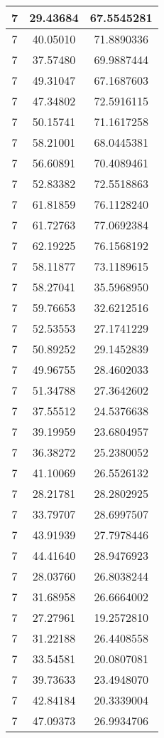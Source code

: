 \documentclass[
]{book}
\begin{document}
\begin{tabular}{c|c|c}
\hline
7 & 29.43684 & 67.5545281\\
\hline
7 & 40.05010 & 71.8890336\\
\hline
7 & 37.57480 & 69.9887444\\
\hline
7 & 49.31047 & 67.1687603\\
\hline
7 & 47.34802 & 72.5916115\\
\hline
7 & 50.15741 & 71.1617258\\
\hline
7 & 58.21001 & 68.0445381\\
\hline
7 & 56.60891 & 70.4089461\\
\hline
7 & 52.83382 & 72.5518863\\
\hline
7 & 61.81859 & 76.1128240\\
\hline
7 & 61.72763 & 77.0692384\\
\hline
7 & 62.19225 & 76.1568192\\
\hline
7 & 58.11877 & 73.1189615\\
\hline
7 & 58.27041 & 35.5968950\\
\hline
7 & 59.76653 & 32.6212516\\
\hline
7 & 52.53553 & 27.1741229\\
\hline
7 & 50.89252 & 29.1452839\\
\hline
7 & 49.96755 & 28.4602033\\
\hline
7 & 51.34788 & 27.3642602\\
\hline
7 & 37.55512 & 24.5376638\\
\hline
7 & 39.19959 & 23.6804957\\
\hline
7 & 36.38272 & 25.2380052\\
\hline
7 & 41.10069 & 26.5526132\\
\hline
7 & 28.21781 & 28.2802925\\
\hline
7 & 33.79707 & 28.6997507\\
\hline
7 & 43.91939 & 27.7978446\\
\hline
7 & 44.41640 & 28.9476923\\
\hline
7 & 28.03760 & 26.8038244\\
\hline
7 & 31.68958 & 26.6664002\\
\hline
7 & 27.27961 & 19.2572810\\
\hline
7 & 31.22188 & 26.4408558\\
\hline
7 & 33.54581 & 20.0807081\\
\hline
7 & 39.73633 & 23.4948070\\
\hline
7 & 42.84184 & 20.3339004\\
\hline
7 & 47.09373 & 26.9934706\\

\end{tabular}
\end{document}
